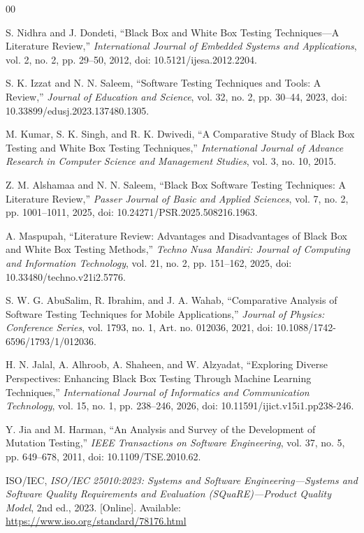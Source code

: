 \documentclass[conference]{IEEEtran}
\begin{document}
\balance



\begin{thebibliography}{00}

S. Nidhra and J. Dondeti, ``Black Box and White Box Testing Techniques---A Literature Review,'' \emph{International Journal of Embedded Systems and Applications}, vol. 2, no. 2, pp. 29--50, 2012, doi: 10.5121/ijesa.2012.2204.

S. K. Izzat and N. N. Saleem, ``Software Testing Techniques and Tools: A Review,'' \emph{Journal of Education and Science}, vol. 32, no. 2, pp. 30--44, 2023, doi: 10.33899/edusj.2023.137480.1305.

M. Kumar, S. K. Singh, and R. K. Dwivedi, ``A Comparative Study of Black Box Testing and White Box Testing Techniques,'' \emph{International Journal of Advance Research in Computer Science and Management Studies}, vol. 3, no. 10, 2015.

Z. M. Alshamaa and N. N. Saleem, ``Black Box Software Testing Techniques: A Literature Review,'' \emph{Passer Journal of Basic and Applied Sciences}, vol. 7, no. 2, pp. 1001--1011, 2025, doi: 10.24271/PSR.2025.508216.1963.

A. Maspupah, ``Literature Review: Advantages and Disadvantages of Black Box and White Box Testing Methods,'' \emph{Techno Nusa Mandiri: Journal of Computing and Information Technology}, vol. 21, no. 2, pp. 151--162, 2025, doi: 10.33480/techno.v21i2.5776.

S. W. G. AbuSalim, R. Ibrahim, and J. A. Wahab, ``Comparative Analysis of Software Testing Techniques for Mobile Applications,'' \emph{Journal of Physics: Conference Series}, vol. 1793, no. 1, Art. no. 012036, 2021, doi: 10.1088/1742-6596/1793/1/012036.

H. N. Jalal, A. Alhroob, A. Shaheen, and W. Alzyadat, ``Exploring Diverse Perspectives: Enhancing Black Box Testing Through Machine Learning Techniques,'' \emph{International Journal of Informatics and Communication Technology}, vol. 15, no. 1, pp. 238--246, 2026, doi: 10.11591/ijict.v15i1.pp238-246.

Y. Jia and M. Harman, ``An Analysis and Survey of the Development of Mutation Testing,'' \emph{IEEE Transactions on Software Engineering}, vol. 37, no. 5, pp. 649--678, 2011, doi: 10.1109/TSE.2010.62.

ISO/IEC, \emph{ISO/IEC 25010:2023: Systems and Software Engineering---Systems and Software Quality Requirements and Evaluation (SQuaRE)---Product Quality Model}, 2nd ed., 2023. [Online]. Available: \url{https://www.iso.org/standard/78176.html}


\end{thebibliography}
\end{document}
